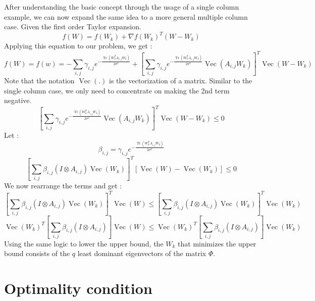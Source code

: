 \documentclass{article}
\newcommand{\tmop}[1]{\ensuremath{\operatorname{#1}}}
\begin{document}
After understanding the basic concept through the usage of a single column
example, we can now expand the same idea to a more general multiple column
case. Given the first order Taylor expansion.
\begin{equation}
  f (W) = f (W_k) + \nabla f (W_k)^T  (W - W_k)
\end{equation}
Applying this equation to our problem, we get :
\[ f (W) = f (w) = - \sum_{i, j} \gamma_{i, j} e^{- \frac{\tmop{Tr} (W^T_k
   A_{i, j} W_k)}{2 \sigma^2}} + \left[ \sum_{i, j} \gamma_{i, j} e^{-
   \frac{\tmop{Tr} (W^T_k A_{i, j} W_k)}{2 \sigma^2}} \tmop{Vec} (A_{i, j}
   W_k) \right]^T \tmop{Vec} (W - W_k) \]
Note that the notation $\tmop{Vec} (.)$ is the vectorization of a matrix.
Similar to the single column case, we only need to concentrate on making the
2nd term negative.
\[ \left[ \sum_{i, j} \gamma_{i, j} e^{- \frac{\tmop{Tr} (W^T_k A_{i, j}
   W_k)}{2 \sigma^2}} \tmop{Vec} (A_{i, j} W_k) \right]^T \tmop{Vec} (W - W_k)
   \leq 0 \]
Let :
\[ \beta_{i, j} = \gamma_{i, j} e^{- \frac{\tmop{Tr} (W^T_k A_{i, j} W_k)}{2
   \sigma^2}} \]
\[ \left[ \sum_{i, j} \beta_{i, j} (I \otimes A_{i, j}) \tmop{Vec} (W_k)
   \right]^T  [\tmop{Vec} (W) - \tmop{Vec} (W_k)] \leq 0 \]
We now rearrange the terms and get :
\[ \left[ \sum_{i, j} \beta_{i, j} (I \otimes A_{i, j}) \tmop{Vec} (W_k)
   \right]^T \tmop{Vec} (W) \leq \left[ \sum_{i, j} \beta_{i, j} (I \otimes
   A_{i, j}) \tmop{Vec} (W_k) \right]^T \tmop{Vec} (W_k) \]
\[ \tmop{Vec} (W_k)^T \left[ \sum_{i, j} \beta_{i, j} (I \otimes A_{i, j})
   \right] \tmop{Vec} (W) \leq \tmop{Vec} (W_k)^T \left[ \sum_{i, j} \beta_{i,
   j} (I \otimes A_{i, j}) \right] \tmop{Vec} (W_k) \]
Using the same logic to lower the upper bound, the $W_k$ that minimizes the
upper bound consists of the $q$ least dominant eigenvectors of the matrix
$\Phi$.

\section{Optimality condition}
\end{document}
